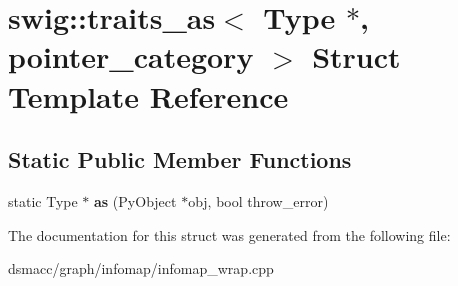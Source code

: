 \hypertarget{structswig_1_1traits__as_3_01Type_01_5_00_01pointer__category_01_4}{}\section{swig\+:\+:traits\+\_\+as$<$ Type $\ast$, pointer\+\_\+category $>$ Struct Template Reference}
\label{structswig_1_1traits__as_3_01Type_01_5_00_01pointer__category_01_4}
\subsection*{Static Public Member Functions}
\begin{DoxyCompactItemize}
\item 
\mbox{\label{structswig_1_1traits__as_3_01Type_01_5_00_01pointer__category_01_4_a7312181fed828608a6a29b4ff622a85f}} 
static Type $\ast$ {\bfseries as} (Py\+Object $\ast$obj, bool throw\+\_\+error)
\end{DoxyCompactItemize}


The documentation for this struct was generated from the following file\+:\begin{DoxyCompactItemize}
\item 
dsmacc/graph/infomap/infomap\+\_\+wrap.\+cpp\end{DoxyCompactItemize}
